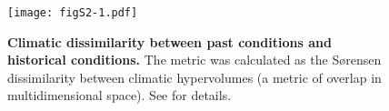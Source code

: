 \documentclass[preprint,12pt,authoryear]{elsarticle}
\begin{document}
\begin{figure}[htpb]
\centering
\texttt{[image: figS2-1.pdf]}
\caption{\textbf{Climatic dissimilarity between past conditions and historical conditions.} The metric was calculated as the Sørensen dissimilarity between climatic hypervolumes (a metric of overlap in multidimensional space). See \cite{VanderMeersch2024} for details.}
\end{figure}

\newpage



 






\end{document}
